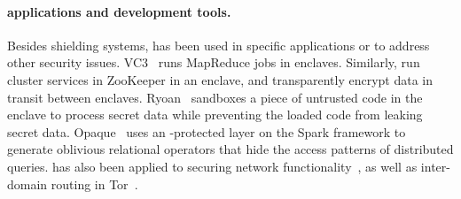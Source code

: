 \paragraph{\sgx{} applications and development tools.}
Besides shielding systems,
\sgx{} has been used in specific applications or to address other security issues.
VC3~\cite{vc3} runs MapReduce jobs in \sgx{} enclaves.
Similarly, \citet{zookeeper}
run cluster services in ZooKeeper in an enclave, and transparently encrypt data in transit between enclaves.
Ryoan~\cite{hunt16ryoan} sandboxes a piece of untrusted code in the enclave
to process secret data while preventing the loaded code from leaking secret data.
Opaque~\cite{zheng2017opaque} uses an \sgx{}-protected layer on the Spark framework to generate oblivious relational operators that hide the access patterns of distributed queries.
\sgx{} has also been applied to securing network functionality~\cite{shih2016s},
as well as inter-domain routing in Tor~\cite{kim2015first}.

